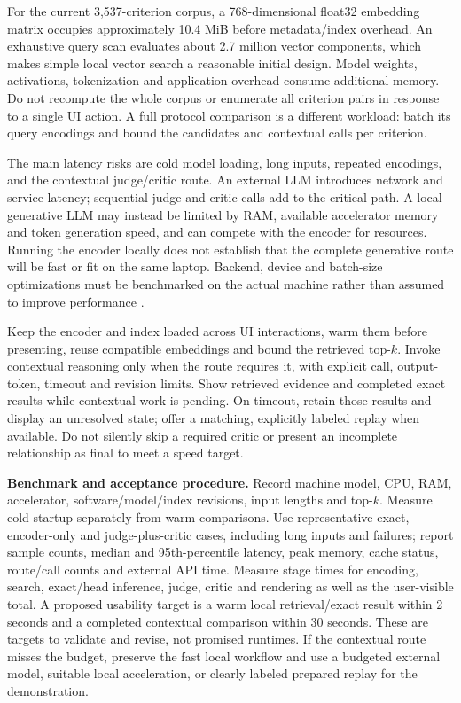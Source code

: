 \documentclass[10pt,letterpaper]{article}
\begin{document}
For the current 3,537-criterion corpus, a 768-dimensional float32 embedding
matrix occupies approximately 10.4 MiB before metadata/index overhead.
An exhaustive query scan evaluates about 2.7 million vector components,
which makes simple local vector search a reasonable initial design. Model
weights, activations, tokenization and application overhead consume
additional memory. Do not recompute the whole corpus or enumerate all
criterion pairs in response to a single UI action. A full protocol comparison
is a different workload: batch its query encodings and bound the candidates
and contextual calls per criterion.

The main latency risks are cold model loading, long inputs, repeated
encodings, and the contextual judge/critic route. An external LLM introduces
network and service latency; sequential judge and critic calls add to the
critical path. A local generative LLM may instead be limited by RAM, available
accelerator memory and token generation speed, and can compete with the
encoder for resources. Running the encoder locally does not establish that
the complete generative route will be fast or fit on the same laptop.
Backend, device and batch-size optimizations must be benchmarked on the
actual machine rather than assumed to improve performance \cite{stefficiency}.

Keep the encoder and index loaded across UI interactions, warm them before
presenting, reuse compatible embeddings and bound the retrieved top-$k$.
Invoke contextual reasoning only when the route requires it, with explicit
call, output-token, timeout and revision limits. Show retrieved evidence and
completed exact results while contextual work is pending. On timeout, retain
those results and display an unresolved state; offer a matching, explicitly
labeled replay when available. Do not silently skip a required critic or
present an incomplete relationship as final to meet a speed target.

\textbf{Benchmark and acceptance procedure.} Record machine model, CPU,
RAM, accelerator, software/model/index revisions, input lengths and top-$k$.
Measure cold startup separately from warm comparisons. Use representative
exact, encoder-only and judge-plus-critic cases, including long inputs and
failures; report sample counts, median and 95th-percentile latency, peak
memory, cache status, route/call counts and external API time. Measure stage
times for encoding, search, exact/head inference, judge, critic and rendering
as well as the user-visible total. A proposed usability target is a warm
local retrieval/exact result within 2 seconds and a completed contextual
comparison within 30 seconds. These are targets to validate and revise,
not promised runtimes. If the contextual route misses the budget, preserve
the fast local workflow and use a budgeted external model, suitable local
acceleration, or clearly labeled prepared replay for the demonstration.
\end{document}
